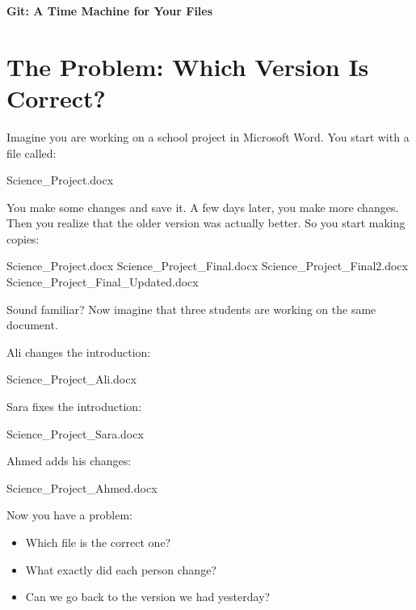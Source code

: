 \documentclass[11pt,a4paper]{article}
\begin{document}
\begin{center}
    {\Huge \textbf{Git: A Time Machine for Your Files}}\\[0.5em]
\end{center}

\vspace{1em}

\section{The Problem: Which Version Is Correct?}

Imagine you are working on a school project in Microsoft Word. You start with a file called:

\begin{code}
Science_Project.docx
\end{code}

You make some changes and save it. A few days later, you make more changes. Then you realize that the older version was actually better. So you start making copies:

\begin{code}
Science_Project.docx
Science_Project_Final.docx
Science_Project_Final2.docx
Science_Project_Final_Updated.docx
\end{code}

Sound familiar? Now imagine that three students are working on the same document. 

Ali changes the introduction:

\begin{code}
Science_Project_Ali.docx
\end{code}

Sara fixes the introduction:

\begin{code}
Science_Project_Sara.docx
\end{code}

Ahmed adds his changes:

\begin{code}
Science_Project_Ahmed.docx
\end{code}







Now you have a problem:

\begin{itemize}
    \item Which file is the correct one?
    \item What exactly did each person change?
    \item Can we go back to the version we had yesterday?
\end{itemize}
\end{document}
